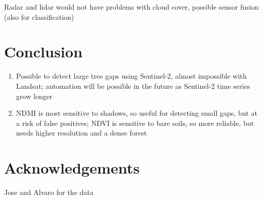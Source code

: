 \documentclass[a4paper,12pt]{scrbook}
\begin{document}
Radar and lidar would not have problems with cloud cover, possible sensor fusion (also for classification)

\chapter{Conclusion}

\begin{enumerate}
 \item Possible to detect large tree gaps using Sentinel-2, almost impossible with Landsat; automation will be possible in the future as Sentinel-2 time series grow longer
 \item \ac{NDMI} is most sensitive to shadows, so useful for detecting small gaps, but at a risk of false positives; \ac{NDVI} is sensitive to bare soils, so more reliable, but needs higher resolution and a dense forest
\end{enumerate}

\chapter{Acknowledgements}

Jose and Alvaro for the data

\printnoidxglossary[type=acronym]


\end{document}
